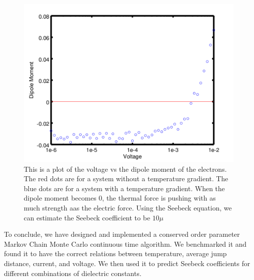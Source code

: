 \begin{figure}[htbp]
\begin{center}
\includegraphics[scale=.50]{DvV.png}
\caption{This is a plot of the voltage vs the dipole moment of the electrons. The red dots are for a system without a temperature gradient. The blue dots are for a system with a temperature gradient. When the dipole moment becomes 0, the thermal force is pushing with as much strength aas the electric force. Using the Seebeck equation, we can estimate the Seebeck coefficient to be $10 \mu$}
\label{TvJ}
\end{center}
\end{figure}

To conclude, we have designed and implemented a conserved order parameter Markov Chain Monte Carlo continuous time algorithm. We benchmarked it and found it to have the correct relations between temperature, average jump distance, current, and voltage. We then used it to predict Seebeck coefficients for different combinations of dielectric constants.
